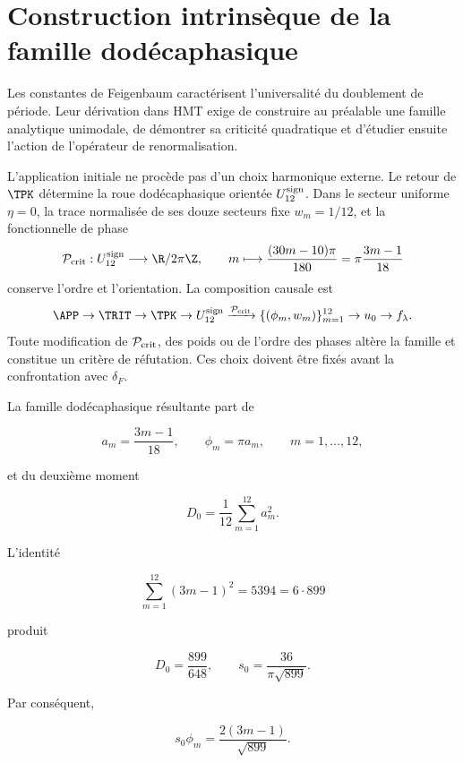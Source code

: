 \label{mab:rm:ch:chaos}

\section{Construction intrinsèque de la famille dodécaphasique}

Les constantes de Feigenbaum caractérisent l’universalité du
doublement de période. Leur dérivation dans HMT exige de construire au préalable
une famille analytique unimodale, de démontrer sa criticité quadratique et
d’étudier ensuite l’action de l’opérateur de renormalisation.

L’application initiale ne procède pas d’un choix harmonique externe. Le retour
de \(\TPK\) détermine la roue dodécaphasique orientée
\(U_{12}^{\rm sign}\). Dans le secteur uniforme \(\eta=0\), la trace
normalisée de ses douze secteurs fixe \(w_m=1/12\), et la fonctionnelle de phase
\begin{equation}
\mathcal P_{\rm crit}:U_{12}^{\rm sign}\longrightarrow\R/2\pi\Z,
\qquad
m\longmapsto \frac{(30m-10)\pi}{180}
=\pi\frac{3m-1}{18}
\label{mab:rm:eq:critical-phase-reader}
\end{equation}
conserve l’ordre et l’orientation. La composition causale est
\[
\APP\to\TRIT\to\TPK\to U_{12}^{\rm sign}
\xrightarrow{\mathcal P_{\rm crit}}
\{(\phi_m,w_m)\}_{m=1}^{12}
\to u_0\to f_\lambda.
\]
Toute modification de \(\mathcal P_{\rm crit}\), des poids ou de l’ordre des
phases altère la famille et constitue un critère de réfutation. Ces
choix doivent être fixés avant la confrontation avec \(\delta_F\).

La famille dodécaphasique résultante part de

\[
a_m=\frac{3m-1}{18},\qquad
\phi_m=\pi a_m,\qquad m=1,\ldots,12,
\]

et du deuxième moment

\[
D_0=\frac1{12}\sum_{m=1}^{12}a_m^2.
\]

L’identité

\begin{equation}
\sum_{m=1}^{12}(3m-1)^2=5394=6\cdot899
\label{mab:rm:eq:chaos-sum2}
\end{equation}

produit

\[
D_0=\frac{899}{648},\qquad
s_0=\frac{36}{\pi\sqrt{899}}.
\]

Par conséquent,

\begin{equation}
s_0\phi_m=\frac{2(3m-1)}{\sqrt{899}}.
\label{mab:rm:eq:pi-cancellation}
\end{equation}

